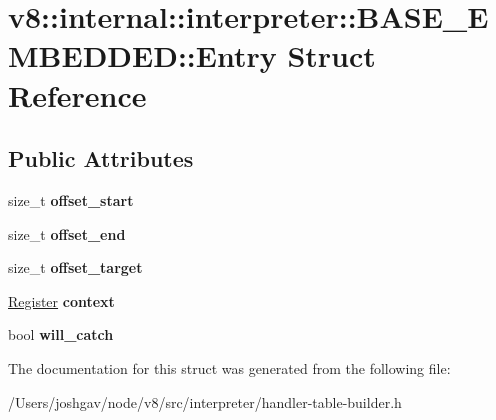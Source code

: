 \hypertarget{structv8_1_1internal_1_1interpreter_1_1_b_a_s_e___e_m_b_e_d_d_e_d_1_1_entry}{}\section{v8\+:\+:internal\+:\+:interpreter\+:\+:B\+A\+S\+E\+\_\+\+E\+M\+B\+E\+D\+D\+ED\+:\+:Entry Struct Reference}
\label{structv8_1_1internal_1_1interpreter_1_1_b_a_s_e___e_m_b_e_d_d_e_d_1_1_entry}
\subsection*{Public Attributes}
\begin{DoxyCompactItemize}
\item 
size\+\_\+t {\bfseries offset\+\_\+start}\hypertarget{structv8_1_1internal_1_1interpreter_1_1_b_a_s_e___e_m_b_e_d_d_e_d_1_1_entry_a1acb684551c900df484fe6cc949ce4d0}{}\label{structv8_1_1internal_1_1interpreter_1_1_b_a_s_e___e_m_b_e_d_d_e_d_1_1_entry_a1acb684551c900df484fe6cc949ce4d0}

\item 
size\+\_\+t {\bfseries offset\+\_\+end}\hypertarget{structv8_1_1internal_1_1interpreter_1_1_b_a_s_e___e_m_b_e_d_d_e_d_1_1_entry_a28e0e9a9b0cb208ee715fc8ad4cc6f60}{}\label{structv8_1_1internal_1_1interpreter_1_1_b_a_s_e___e_m_b_e_d_d_e_d_1_1_entry_a28e0e9a9b0cb208ee715fc8ad4cc6f60}

\item 
size\+\_\+t {\bfseries offset\+\_\+target}\hypertarget{structv8_1_1internal_1_1interpreter_1_1_b_a_s_e___e_m_b_e_d_d_e_d_1_1_entry_a1c1da1874674e8623e7aaae6264bb0da}{}\label{structv8_1_1internal_1_1interpreter_1_1_b_a_s_e___e_m_b_e_d_d_e_d_1_1_entry_a1c1da1874674e8623e7aaae6264bb0da}

\item 
\hyperlink{classv8_1_1internal_1_1interpreter_1_1_register}{Register} {\bfseries context}\hypertarget{structv8_1_1internal_1_1interpreter_1_1_b_a_s_e___e_m_b_e_d_d_e_d_1_1_entry_a774ac3145000b78e24abc838412678d3}{}\label{structv8_1_1internal_1_1interpreter_1_1_b_a_s_e___e_m_b_e_d_d_e_d_1_1_entry_a774ac3145000b78e24abc838412678d3}

\item 
bool {\bfseries will\+\_\+catch}\hypertarget{structv8_1_1internal_1_1interpreter_1_1_b_a_s_e___e_m_b_e_d_d_e_d_1_1_entry_a37d25168638b967b54905bb8d2a76077}{}\label{structv8_1_1internal_1_1interpreter_1_1_b_a_s_e___e_m_b_e_d_d_e_d_1_1_entry_a37d25168638b967b54905bb8d2a76077}

\end{DoxyCompactItemize}


The documentation for this struct was generated from the following file\+:\begin{DoxyCompactItemize}
\item 
/\+Users/joshgav/node/v8/src/interpreter/handler-\/table-\/builder.\+h\end{DoxyCompactItemize}
